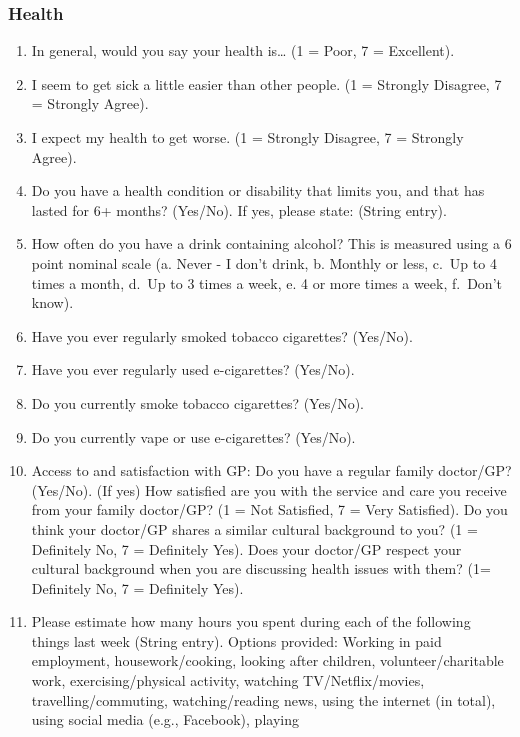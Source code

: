 \documentclass[
]{interact}
\providecommand{\tightlist}{%
  \setlength{\itemsep}{0pt}\setlength{\parskip}{0pt}}\usepackage{longtable,booktabs,array}
\begin{document}
\subsubsection{Health}\label{health}

\begin{enumerate}
\def\labelenumi{\arabic{enumi}.}
\tightlist
\item
  In general, would you say your health is\ldots{} (1 = Poor, 7 =
  Excellent).
\item
  I seem to get sick a little easier than other people. (1 = Strongly
  Disagree, 7 = Strongly Agree).
\item
  I expect my health to get worse. (1 = Strongly Disagree, 7 = Strongly
  Agree).
\item
  Do you have a health condition or disability that limits you, and that
  has lasted for 6+ months? (Yes/No). If yes, please state: (String
  entry).
\item
  How often do you have a drink containing alcohol? This is measured
  using a 6 point nominal scale (a. Never - I don't drink, b. Monthly or
  less, c.~Up to 4 times a month, d.~Up to 3 times a week, e. 4 or more
  times a week, f.~Don't know).
\item
  Have you ever regularly smoked tobacco cigarettes? (Yes/No).
\item
  Have you ever regularly used e-cigarettes? (Yes/No).
\item
  Do you currently smoke tobacco cigarettes? (Yes/No).
\item
  Do you currently vape or use e-cigarettes? (Yes/No).
\item
  Access to and satisfaction with GP: Do you have a regular family
  doctor/GP? (Yes/No). (If yes) How satisfied are you with the service
  and care you receive from your family doctor/GP? (1 = Not Satisfied, 7
  = Very Satisfied). Do you think your doctor/GP shares a similar
  cultural background to you? (1 = Definitely No, 7 = Definitely Yes).
  Does your doctor/GP respect your cultural background when you are
  discussing health issues with them? (1= Definitely No, 7 = Definitely
  Yes).
\item
  Please estimate how many hours you spent during each of the following
  things last week (String entry). Options provided: Working in paid
  employment, housework/cooking, looking after children,
  volunteer/charitable work, exercising/physical activity, watching
  TV/Netflix/movies, travelling/commuting, watching/reading news, using
  the internet (in total), using social media (e.g., Facebook), playing

\end{enumerate}
\end{document}
